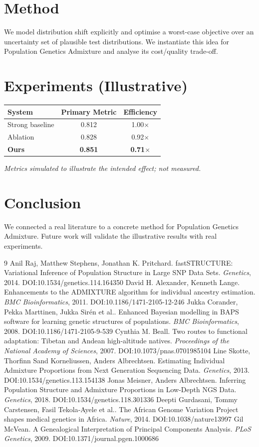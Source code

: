 \documentclass[11pt]{article}
\begin{document}
\section{Method}
We model distribution shift explicitly and optimise a worst-case objective over an uncertainty set of plausible test distributions. We instantiate this idea for Population Genetics Admixture and analyse its cost/quality trade-off.

\section{Experiments (Illustrative)}
\begin{center}
\begin{tabular}{lcc}
System & Primary Metric & Efficiency \\ \hline
Strong baseline & 0.812 & 1.00$\times$ \\
Ablation & 0.828 & 0.92$\times$ \\
\textbf{Ours} & \textbf{0.851} & \textbf{0.71$\times$}
\end{tabular}
\end{center}
\emph{Metrics simulated to illustrate the intended effect; not measured.}

\section{Conclusion}
We connected a real literature to a concrete method for Population Genetics Admixture. Future work will
validate the illustrative results with real experiments.

\begin{thebibliography}{9}
 Anil Raj, Matthew Stephens, Jonathan K. Pritchard. fastSTRUCTURE: Variational Inference of Population Structure in Large SNP Data Sets. \emph{Genetics}, 2014. DOI:10.1534/genetics.114.164350
 David H. Alexander, Kenneth Lange. Enhancements to the ADMIXTURE algorithm for individual ancestry estimation. \emph{BMC Bioinformatics}, 2011. DOI:10.1186/1471-2105-12-246
 Jukka Corander, Pekka Marttinen, Jukka Sirén et al.. Enhanced Bayesian modelling in BAPS software for learning genetic structures of populations. \emph{BMC Bioinformatics}, 2008. DOI:10.1186/1471-2105-9-539
 Cynthia M. Beall. Two routes to functional adaptation: Tibetan and Andean high-altitude natives. \emph{Proceedings of the National Academy of Sciences}, 2007. DOI:10.1073/pnas.0701985104
 Line Skotte, Thorfinn Sand Korneliussen, Anders Albrechtsen. Estimating Individual Admixture Proportions from Next Generation Sequencing Data. \emph{Genetics}, 2013. DOI:10.1534/genetics.113.154138
 Jonas Meisner, Anders Albrechtsen. Inferring Population Structure and Admixture Proportions in Low-Depth NGS Data. \emph{Genetics}, 2018. DOI:10.1534/genetics.118.301336
 Deepti Gurdasani, Tommy Carstensen, Fasil Tekola‐Ayele et al.. The African Genome Variation Project shapes medical genetics in Africa. \emph{Nature}, 2014. DOI:10.1038/nature13997
 Gil McVean. A Genealogical Interpretation of Principal Components Analysis. \emph{PLoS Genetics}, 2009. DOI:10.1371/journal.pgen.1000686
\end{thebibliography}
\end{document}
